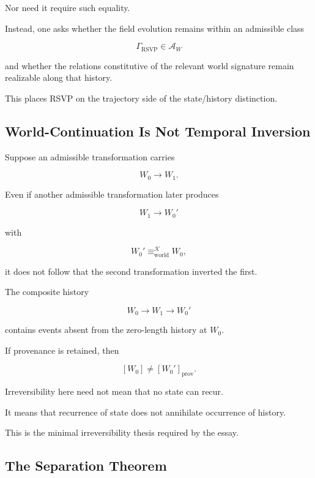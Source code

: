 \documentclass[
  11pt,
  a4paper,
  DIV=12,
  BCOR=0mm,
  parskip=half-
]{scrartcl}
\newcommand{\eqworld}{%
  \equiv_{\mathrm{world}}%
}
\theoremstyle{definition}
\theoremstyle{plain}
\theoremstyle{remark}
\begin{document}
Nor need it require such equality.

Instead, one asks whether the field evolution remains within an admissible
class

\[
  \Gamma_{\mathrm{RSVP}}
  \in
  \mathcal A_W
\]

and whether the relations constitutive of the relevant world signature remain
realizable along that history.

This places RSVP on the trajectory side of the state/history distinction.


\subsection{World-Continuation Is Not Temporal Inversion}
\label{app:world-irreversibility}

Suppose an admissible transformation carries

\[
  W_0\to W_1.
\]

Even if another admissible transformation later produces

\[
  W_1\to W_0'
\]

with

\[
  W_0'\eqworld^{\mathcal K}W_0,
\]

it does not follow that the second transformation inverted the first.

The composite history

\[
  W_0
  \to
  W_1
  \to
  W_0'
\]

contains events absent from the zero-length history at \(W_0\).

If provenance is retained, then

\[
  [W_0]
  \neq
  [W_0']_{\mathrm{prov}}.
\]

Irreversibility here need not mean that no state can recur.

It means that recurrence of state does not annihilate occurrence of history.

This is the minimal irreversibility thesis required by the essay.


\subsection{The Separation Theorem}
\label{app:separation-theorem}
\end{document}
